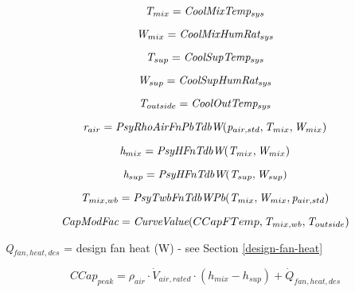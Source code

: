 \begin{equation}
\emph{T\(_{mix}\)} = \emph{CoolMixTemp\(_{sys}\)}
\end{equation}

\begin{equation}
\emph{W\(_{mix}\)} = \emph{CoolMixHumRat\(_{sys}\)}
\end{equation}

\begin{equation}
\emph{T\(_{sup}\)} = \emph{CoolSupTemp\(_{sys}\)}
\end{equation}

\begin{equation}
\emph{W\(_{sup}\)} = \emph{CoolSupHumRat\(_{sys}\)}
\end{equation}

\begin{equation}
\emph{T\(_{outside}\)} = \emph{CoolOutTemp\(_{sys}\)}
\end{equation}

\begin{equation}
\emph{r\(_{air}\)} = \emph{PsyRhoAirFnPbTdbW}(\emph{p\(_{air,std}\)}, \emph{T\(_{mix}\)},\emph{W\(_{mix}\)})
\end{equation}

\begin{equation}
\emph{h\(_{mix}\)} = \emph{PsyHFnTdbW}(\emph{T\(_{mix}\)},\emph{W\(_{mix}\)})
\end{equation}

\begin{equation}
\emph{h\(_{sup}\)} = \emph{PsyHFnTdbW}(\emph{T\(_{sup}\)},\emph{W\(_{sup}\)})
\end{equation}

\begin{equation}
\emph{T\(_{mix,wb}\)} = \emph{PsyTwbFnTdbWPb}(\emph{T\(_{mix}\)},\emph{W\(_{mix}\)}, \emph{p\(_{air,std}\)})
\end{equation}

\begin{equation}
\emph{CapModFac} = \emph{CurveValue}(CCapFTemp,\emph{T\(_{mix,wb}\)},\emph{T\(_{outside}\)})
\end{equation}

\emph{Q\(_{fan,heat,des}\)} = design fan heat (W) - see Section \ref{design-fan-heat}

\begin{equation}
CCap_{peak} = \rho_{air} \cdot \dot V_{air,rated} \cdot (h_{mix} - h_{sup}) + \dot{Q}_{fan,heat,des}
\end{equation}

